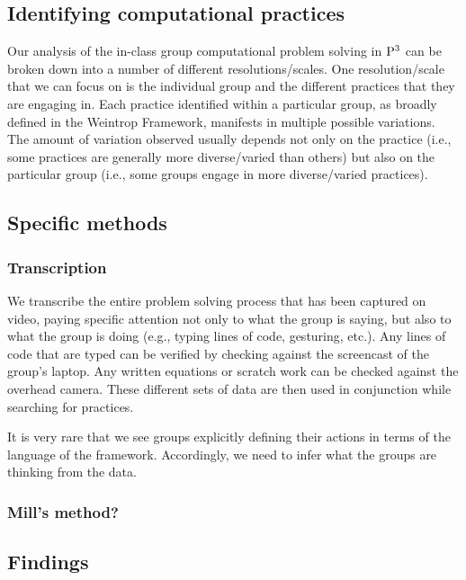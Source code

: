 \documentclass{msuphddissertation}
\begin{document}
\begin{doublespace}
%
%

\chapter{Identifying computational practices}

Our analysis of the in-class group computational problem solving in ${\rm P}^{3}$ can be broken down into a number of different resolutions/scales.  One resolution/scale that we can focus on is the individual group and the different practices that they are engaging in.  Each practice identified within a particular group, as broadly defined in the Weintrop Framework, manifests in multiple possible variations.  The amount of variation observed usually depends not only on the practice (i.e., some practices are generally more diverse/varied than others) but also on the particular group (i.e., some groups engage in more diverse/varied practices).

\section{Specific methods}

\subsection{Transcription}

We transcribe the entire problem solving process that has been captured on video, paying specific attention not only to what the group is saying, but also to what the group is doing (e.g., typing lines of code, gesturing, etc.).  Any lines of code that are typed can be verified by checking against the screencast of the group's laptop.  Any written equations or scratch work can be checked against the overhead camera.  These different sets of data are then used in conjunction while searching for practices. 

It is very rare that we see groups explicitly defining their actions in terms of the language of the framework.  Accordingly, we need to infer what the groups are thinking from the data.

\subsection{Mill's method?}

\section{Findings}


\end{doublespace}
\end{document}
